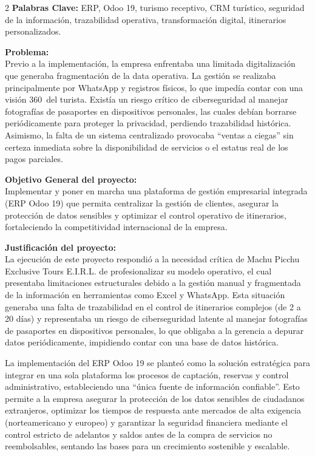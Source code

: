 \documentclass[12pt]{article}
\begin{document}
\newpage
\begin{multicols}{2}
\textbf{Palabras Clave:} ERP, Odoo 19, turismo receptivo, CRM turístico, seguridad de la información, trazabilidad operativa, transformación digital, itinerarios personalizados.

\textbf{Problema:}\\
Previo a la implementación, la empresa enfrentaba una limitada digitalización que generaba fragmentación de la data operativa. La gestión se realizaba principalmente por WhatsApp y registros físicos, lo que impedía contar con una visión 360\textdegree\ del turista. Existía un riesgo crítico de ciberseguridad al manejar fotografías de pasaportes en dispositivos personales, las cuales debían borrarse periódicamente para proteger la privacidad, perdiendo trazabilidad histórica. Asimismo, la falta de un sistema centralizado provocaba ``ventas a ciegas'' sin certeza inmediata sobre la disponibilidad de servicios o el estatus real de los pagos parciales.

\textbf{Objetivo General del proyecto:}\\
Implementar y poner en marcha una plataforma de gestión empresarial integrada (ERP Odoo 19) que permita centralizar la gestión de clientes, asegurar la protección de datos sensibles y optimizar el control operativo de itinerarios, fortaleciendo la competitividad internacional de la empresa.

\textbf{Justificación del proyecto:}\\
La ejecución de este proyecto respondió a la necesidad crítica de Machu Picchu Exclusive Tours E.I.R.L. de profesionalizar su modelo operativo, el cual presentaba limitaciones estructurales debido a la gestión manual y fragmentada de la información en herramientas como Excel y WhatsApp. Esta situación generaba una falta de trazabilidad en el control de itinerarios complejos (de 2 a 20 días) y representaba un riesgo de ciberseguridad latente al manejar fotografías de pasaportes en dispositivos personales, lo que obligaba a la gerencia a depurar datos periódicamente, impidiendo contar con una base de datos histórica.

La implementación del ERP Odoo 19 se planteó como la solución estratégica para integrar en una sola plataforma los procesos de captación, reservas y control administrativo, estableciendo una ``única fuente de información confiable''. Esto permite a la empresa asegurar la protección de los datos sensibles de ciudadanos extranjeros, optimizar los tiempos de respuesta ante mercados de alta exigencia (norteamericano y europeo) y garantizar la seguridad financiera mediante el control estricto de adelantos y saldos antes de la compra de servicios no reembolsables, sentando las bases para un crecimiento sostenible y escalable.


\end{multicols}
\end{document}
